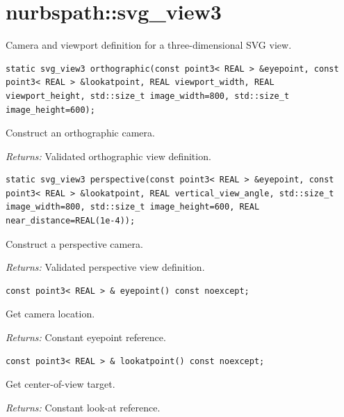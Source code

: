 \section{nurbspath::svg\_view3}
Camera and viewport definition for a three-dimensional SVG view.
\par\noindent\begin{minipage}{\linewidth}
\begin{lstlisting}[style=apireference]
static svg_view3 orthographic(const point3< REAL > &eyepoint, const point3< REAL > &lookatpoint, REAL viewport_width, REAL viewport_height, std::size_t image_width=800, std::size_t image_height=600);
\end{lstlisting}
{\footnotesize Construct an orthographic camera.\par}
{\footnotesize\textit{Returns:} Validated orthographic view definition.\par}
\end{minipage}\par\vspace{1pt}
\par\noindent\begin{minipage}{\linewidth}
\begin{lstlisting}[style=apireference]
static svg_view3 perspective(const point3< REAL > &eyepoint, const point3< REAL > &lookatpoint, REAL vertical_view_angle, std::size_t image_width=800, std::size_t image_height=600, REAL near_distance=REAL(1e-4));
\end{lstlisting}
{\footnotesize Construct a perspective camera.\par}
{\footnotesize\textit{Returns:} Validated perspective view definition.\par}
\end{minipage}\par\vspace{1pt}
\par\noindent\begin{minipage}{\linewidth}
\begin{lstlisting}[style=apireference]
const point3< REAL > & eyepoint() const noexcept;
\end{lstlisting}
{\footnotesize Get camera location.\par}
{\footnotesize\textit{Returns:} Constant eyepoint reference.\par}
\end{minipage}\par\vspace{1pt}
\par\noindent\begin{minipage}{\linewidth}
\begin{lstlisting}[style=apireference]
const point3< REAL > & lookatpoint() const noexcept;
\end{lstlisting}
{\footnotesize Get center-of-view target.\par}
{\footnotesize\textit{Returns:} Constant look-at reference.\par}
\end{minipage}\par\vspace{1pt}
